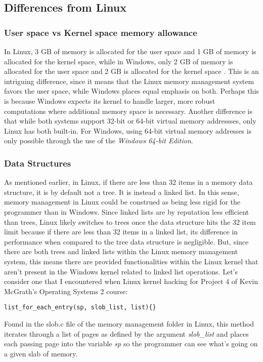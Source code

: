 \documentclass[letterpaper,10pt,draftclsnofoot,onecolumn,titlepage]{IEEEtran}
\begin{document}
\subsection{Differences from Linux}
\subsubsection{User space vs Kernel space memory allowance}
In Linux, 3 GB of memory is allocated for the user space and 1 GB of memory is allocated for the kernel space, while in Windows, only 2 GB of memory is allocated for the user space and 2 GB is allocated for the kernel space \cite{windows1} \cite{linux1}. This is an intriguing difference, since it means that the Linux memory management system favors the user space, while Windows places equal emphasis on both. Perhaps this is because Windows expects its kernel to handle larger, more robust computations where additional memory space is necessary. Another difference is that while both systems support 32-bit or 64-bit virtual memory addressses, only Linux has both built-in. For Windows, using 64-bit virtual memory addresses is only possible through the use of the \emph{Windows 64-bit Edition}.
\subsubsection{Data Structures}
As mentioned earlier, in Linux, if there are less than 32 items in a memory data structure, it is by default not a tree. It is instead a linked list. In this sense, memory management in Linux could be construed as being less rigid for the programmer than in Windows. Since linked lists are by reputation less efficient than trees, Linux likely switches to trees once the data structure hits the 32 item limit because if there are less than 32 items in a linked list, its difference in performance when compared to the tree data structure is negligible. But, since there are both trees and linked lists within the Linux memory management system, this means there are provided functionalities within the Linux kernel that aren't present in the Windows kernel related to linked list operations. Let's consider one that I encountered when Linux kernel hacking for Project 4 of Kevin McGrath's Operating Systems 2 course: 
\begin{lstlisting}
list_for_each_entry(sp, slob_list, list){}
\end{lstlisting}
Found in the slob.c file of the memory management folder in Linux, this method iterates through a list of pages as defined by the argument \emph{slob\_list} 
and places each passing page into the variable \emph{sp} so the programmer can see what's going on a given slab of memory.
\end{document}
